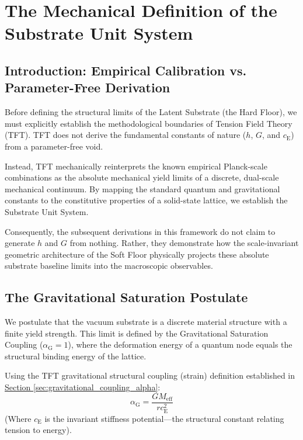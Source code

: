 \chapter{The Mechanical Definition of the Substrate Unit System}
\label{app:substrate_units}

\section{Introduction: Empirical Calibration vs. Parameter-Free Derivation}
Before defining the structural limits of the Latent Substrate (the Hard Floor), we must explicitly establish the methodological boundaries of Tension Field Theory (TFT). TFT does not derive the fundamental constants of nature ($h$, $G$, and $c_{\mathrm{E}}$) from a parameter-free void. 

Instead, TFT mechanically reinterprets the known empirical Planck-scale combinations as the absolute mechanical yield limits of a discrete, dual-scale mechanical continuum. By mapping the standard quantum and gravitational constants to the constitutive properties of a solid-state lattice, we establish the Substrate Unit System. 

Consequently, the subsequent derivations in this framework do not claim to generate $h$ and $G$ from nothing. Rather, they demonstrate how the scale-invariant geometric architecture of the Soft Floor physically projects these absolute substrate baseline limits into the macroscopic observables.

\section{The Gravitational Saturation Postulate}
We postulate that the vacuum substrate is a discrete material structure with a finite yield strength. This limit is defined by the Gravitational Saturation Coupling ($\alpha_{\mathrm{G}} = 1$), where the deformation energy of a quantum node equals the structural binding energy of the lattice.

Using the TFT gravitational structural coupling (strain) definition established in \hyperref[sec:gravitational_coupling_alpha]{Section \ref*{sec:gravitational_coupling_alpha}}:
\begin{equation}
    \alpha_{\mathrm{G}} = \frac{G M_{\mathrm{eff}}}{r c_{\mathrm{E}}^2}
\end{equation}
(Where $c_{\mathrm{E}}$ is the invariant stiffness potential---the structural constant relating tension to energy).

